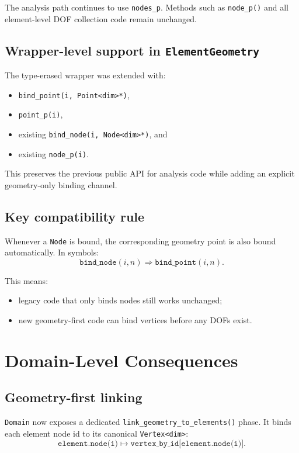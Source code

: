 The analysis path continues to use \texttt{nodes\_p}.  Methods such as
\texttt{node\_p()} and all element-level DOF collection code remain unchanged.

\subsection{Wrapper-level support in \texttt{ElementGeometry}}

The type-erased wrapper was extended with:
\begin{itemize}[nosep]
  \item \texttt{bind\_point(i, Point<dim>*)},
  \item \texttt{point\_p(i)},
  \item existing \texttt{bind\_node(i, Node<dim>*)}, and
  \item existing \texttt{node\_p(i)}.
\end{itemize}

This preserves the previous public API for analysis code while adding an
explicit geometry-only binding channel.

\subsection{Key compatibility rule}

Whenever a \texttt{Node} is bound, the corresponding geometry point is also
bound automatically.  In symbols:
\[
  \texttt{bind\_node}(i, n) \Longrightarrow \texttt{bind\_point}(i, n).
\]

This means:
\begin{itemize}[nosep]
  \item legacy code that only binds nodes still works unchanged;
  \item new geometry-first code can bind vertices before any DOFs exist.
\end{itemize}

\section{Domain-Level Consequences}

\subsection{Geometry-first linking}

\texttt{Domain} now exposes a dedicated
\texttt{link\_geometry\_to\_elements()} phase.  It binds each element node id to
its canonical \texttt{Vertex<dim>}:
\[
  \texttt{element.node(i)} \mapsto \texttt{vertex\_by\_id[element.node(i)]}.
\]

